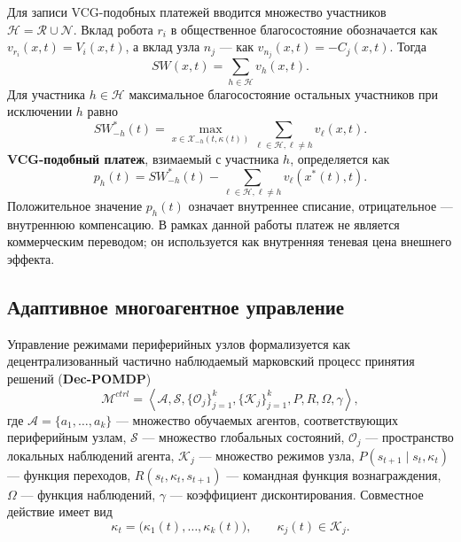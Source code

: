 \documentclass[a4paper,14pt]{extarticle}
\begin{document}
Для записи VCG-подобных платежей вводится множество участников $\mathcal{H}=\mathcal{R}\cup\mathcal{N}$. Вклад робота $r_i$ в общественное благосостояние обозначается как $v_{r_i}(x,t)=V_i(x,t)$, а вклад узла $n_j$ --- как $v_{n_j}(x,t)=-C_j(x,t)$. Тогда
\begin{equation}
	SW(x,t)=\sum_{h\in\mathcal{H}}v_h(x,t).
	\label{eq:nir_sw_by_agents}
\end{equation}
Для участника $h\in\mathcal{H}$ максимальное благосостояние остальных участников при исключении $h$ равно
\begin{equation}
	SW^*_{-h}(t)=\max_{x\in\mathcal{X}_{-h}(t,\kappa(t))}\sum_{\ell\in\mathcal{H},\ell\neq h}v_{\ell}(x,t).
	\label{eq:nir_without_h}
\end{equation}
\textbf{VCG-подобный платеж}, взимаемый с участника $h$, определяется как
\begin{equation}
	p_h(t)=SW^*_{-h}(t)-\sum_{\ell\in\mathcal{H},\ell\neq h}v_{\ell}(x^*(t),t).
	\label{eq:nir_vcg_payment}
\end{equation}
Положительное значение $p_h(t)$ означает внутреннее списание, отрицательное --- внутреннюю компенсацию. В рамках данной работы платеж не является коммерческим переводом; он используется как внутренняя теневая цена внешнего эффекта.

\subsection{Адаптивное многоагентное управление}

Управление режимами периферийных узлов формализуется как децентрализованный частично наблюдаемый марковский процесс принятия решений (\textbf{Dec-POMDP})
\begin{equation}
	\mathcal{M}^{ctrl}=\left\langle \mathcal{A},\mathcal{S},\{\mathcal{O}_j\}_{j=1}^{k},\{\mathcal{K}_j\}_{j=1}^{k},P,R,\Omega,\gamma\right\rangle,
	\label{eq:nir_decpomdp}
\end{equation}
где $\mathcal{A}=\{a_1,\ldots,a_k\}$ --- множество обучаемых агентов, соответствующих периферийным узлам, $\mathcal{S}$ --- множество глобальных состояний, $\mathcal{O}_j$ --- пространство локальных наблюдений агента, $\mathcal{K}_j$ --- множество режимов узла, $P(s_{t+1}\mid s_t,\kappa_t)$ --- функция переходов, $R(s_t,\kappa_t,s_{t+1})$ --- командная функция вознаграждения, $\Omega$ --- функция наблюдений, $\gamma$ --- коэффициент дисконтирования. Совместное действие имеет вид
\begin{equation}
	\kappa_t=\bigl(\kappa_1(t),\ldots,\kappa_k(t)\bigr),\qquad \kappa_j(t)\in\mathcal{K}_j.
	\label{eq:nir_joint_action}
\end{equation}
\end{document}
